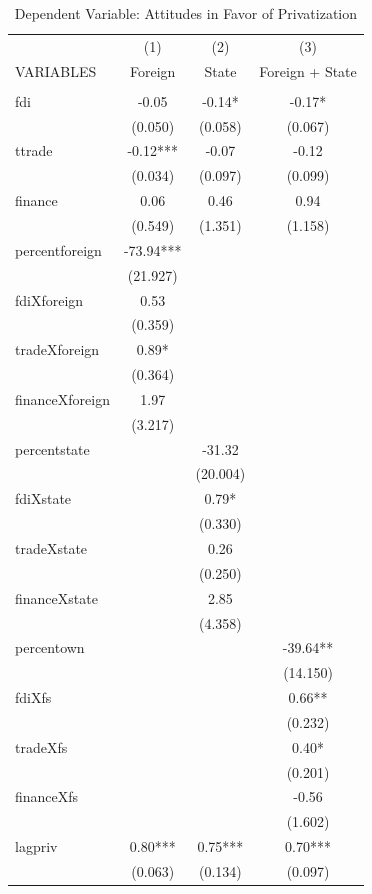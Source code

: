 \documentclass[12pt]{report}
\begin{document}
\begin{table}[htdp]
\caption{Dependent Variable: Attitudes in Favor of Privatization}
\begin{center}
{\footnotesize
\begin{tabular}{lccc} \hline  & (1) & (2) & (3) \\ VARIABLES & Foreign & State & Foreign +
State \\ \hline  & &
 &  \\ fdi & -0.05 &
-0.14* & -0.17* \\  & (0.050) &
(0.058) & (0.067) \\
ttrade & -0.12*** & -0.07 & -0.12 \\  & (0.034) &
(0.097) & (0.099) \\
finance & 0.06 & 0.46 & 0.94 \\  & (0.549) &
(1.351) & (1.158) \\
percentforeign & -73.94*** &  &  \\  & (21.927) &
 &  \\ fdiXforeign &
0.53 &  &  \\  & (0.359) &
 &  \\ tradeXforeign &
0.89* &  &  \\  & (0.364) &
 &  \\ financeXforeign &
1.97 &  &  \\  & (3.217) &
 &  \\ percentstate &  &
-31.32 &  \\  &  &
(20.004) &  \\ fdiXstate
&  & 0.79* &  \\  &  &
(0.330) &  \\
tradeXstate &  & 0.26 &  \\  &  &
(0.250) &  \\
financeXstate &  & 2.85 &  \\  &  &
(4.358) &  \\ percentown
&  &  & -39.64** \\  &  &
 & (14.150) \\ fdiXfs &
&  & 0.66** \\  &  &
 & (0.232) \\ tradeXfs &
&  & 0.40* \\  &  &
 & (0.201) \\ financeXfs
&  &  & -0.56 \\  &  &
 & (1.602) \\ lagpriv &
0.80*** & 0.75*** & 0.70*** \\  & (0.063) &
(0.134) & (0.097) \\

\end{tabular}}
\end{center}
\end{table}
\end{document}
